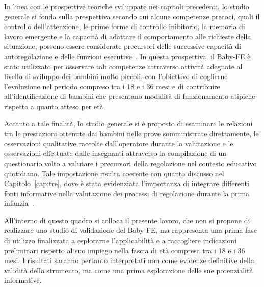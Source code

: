 In linea con le prospettive teoriche sviluppate nei capitoli precedenti, lo studio generale si fonda sulla prospettiva secondo cui alcune competenze precoci, quali il controllo dell'attenzione, le prime forme di controllo inibitorio, la memoria di lavoro emergente e la capacità di adattare il comportamento alle richieste della situazione, possono essere considerate precursori delle successive capacità di autoregolazione e delle funzioni esecutive~\cite{garon2008,diamond2013}. In questa prospettiva, il Baby-FE è stato utilizzato per osservare tali competenze attraverso attività adeguate al livello di sviluppo dei bambini molto piccoli, con l'obiettivo di coglierne l'evoluzione nel periodo compreso tra i 18 e i 36 mesi e di contribuire all'identificazione di bambini che presentano modalità di funzionamento atipiche rispetto a quanto atteso per età.

Accanto a tale finalità, lo studio generale si è proposto di esaminare le relazioni tra le prestazioni ottenute dai bambini nelle prove somministrate direttamente, le osservazioni qualitative raccolte dall'operatore durante la valutazione e le osservazioni effettuate dalle insegnanti attraverso la compilazione di un questionario volto a valutare i precursori della regolazione nel contesto educativo quotidiano. Tale impostazione risulta coerente con quanto discusso nel Capitolo~\ref{cap:tre}, dove è stata evidenziata l'importanza di integrare differenti fonti informative nella valutazione dei processi di regolazione durante la prima infanzia~\cite{carlson2005,hughes2002}.

All'interno di questo quadro si colloca il presente lavoro, che non si propone di realizzare uno studio di validazione del Baby-FE, ma rappresenta una prima fase di utilizzo finalizzata a esplorarne l'applicabilità e a raccogliere indicazioni preliminari rispetto al suo impiego nella fascia di età compresa tra i 18 e i 36 mesi. I risultati saranno pertanto interpretati non come evidenze definitive della validità dello strumento, ma come una prima esplorazione delle sue potenzialità informative.

